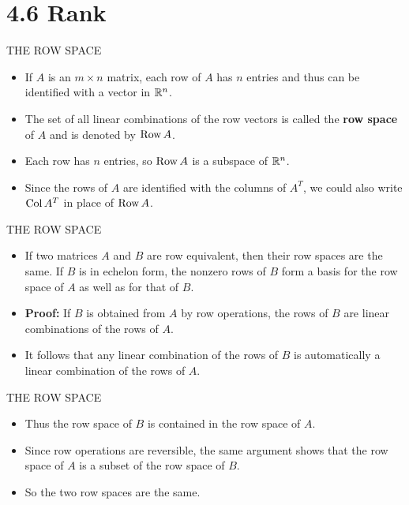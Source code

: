 \section[4.6 Rank]{4.6 Rank}

\begin{frame}[shrink=8]{THE ROW SPACE}
\begin{itemize}
\item If $A$ is an $m\times n$ matrix, each row of $A$ has $n$ entries and thus can be identified with a vector in $\mathbb{R}^n$.
\item The set of all linear combinations of the row vectors is called the \textbf{row space} of $A$ and is denoted by $\operatorname{Row} A$.
\item Each row has $n$ entries, so $\operatorname{Row} A$ is a subspace of $\mathbb{R}^n$.
\item Since the rows of $A$ are identified with the columns of $A^T$, we could also write $\operatorname{Col} A^T$ in place of $\operatorname{Row} A$.
\end{itemize}
\end{frame}

\begin{frame}[shrink=8]{THE ROW SPACE}
\begin{itemize}
\item {} If two matrices $A$ and $B$ are row equivalent, then their row spaces are the same. If $B$ is in echelon form, the nonzero rows of $B$ form a basis for the row space of $A$ as well as for that of $B$.
\item \textbf{Proof:} If $B$ is obtained from $A$ by row operations, the rows of $B$ are linear combinations of the rows of $A$.
\item It follows that any linear combination of the rows of $B$ is automatically a linear combination of the rows of $A$.
\end{itemize}
\end{frame}

\begin{frame}{THE ROW SPACE}
\begin{itemize}
\item Thus the row space of $B$ is contained in the row space of $A$.
\item Since row operations are reversible, the same argument shows that the row space of $A$ is a subset of the row space of $B$.
\item So the two row spaces are the same.
\end{itemize}
\end{frame}

